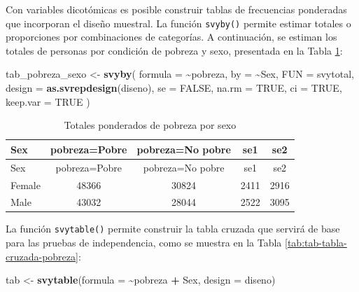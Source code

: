 \documentclass[
  spanish,
  12pt,
]{book}
\newenvironment{Shaded}{\begin{snugshade}}{\end{snugshade}}
\newcommand{\AttributeTok}[1]{\textcolor[rgb]{0.13,0.29,0.53}{#1}}
\newcommand{\ConstantTok}[1]{\textcolor[rgb]{0.56,0.35,0.01}{#1}}
\newcommand{\FunctionTok}[1]{\textcolor[rgb]{0.13,0.29,0.53}{\textbf{#1}}}
\newcommand{\NormalTok}[1]{#1}
\newcommand{\OtherTok}[1]{\textcolor[rgb]{0.56,0.35,0.01}{#1}}
\newcommand{\SpecialCharTok}[1]{\textcolor[rgb]{0.81,0.36,0.00}{\textbf{#1}}}
\begin{document}
Con variables dicotómicas es posible construir tablas de frecuencias ponderadas que incorporan el diseño muestral. La función \texttt{svyby()} permite estimar totales o proporciones por combinaciones de categorías. A continuación, se estiman los totales de personas por condición de pobreza y sexo, presentada en la Tabla \ref{tab:tab-totales-pobreza-sexo}:

\begin{Shaded}
\begin{Highlighting}[]
\NormalTok{tab\_pobreza\_sexo }\OtherTok{\textless{}{-}} \FunctionTok{svyby}\NormalTok{(}
  \AttributeTok{formula =} \SpecialCharTok{\textasciitilde{}}\NormalTok{pobreza,}
  \AttributeTok{by      =} \SpecialCharTok{\textasciitilde{}}\NormalTok{Sex,}
  \AttributeTok{FUN     =}\NormalTok{ svytotal,}
  \AttributeTok{design  =} \FunctionTok{as.svrepdesign}\NormalTok{(diseno),}
  \AttributeTok{se =} \ConstantTok{FALSE}\NormalTok{, }\AttributeTok{na.rm =} \ConstantTok{TRUE}\NormalTok{, }\AttributeTok{ci =} \ConstantTok{TRUE}\NormalTok{, }\AttributeTok{keep.var =} \ConstantTok{TRUE}
\NormalTok{)}
\end{Highlighting}
\end{Shaded}

\begin{longtable}[]{@{}lcccc@{}}
\caption{\label{tab:tab-totales-pobreza-sexo}Totales ponderados de pobreza por sexo}\tabularnewline
\toprule\noalign{}
Sex & pobreza=Pobre & pobreza=No pobre & se1 & se2 \\
\midrule\noalign{}
\endfirsthead
\toprule\noalign{}
Sex & pobreza=Pobre & pobreza=No pobre & se1 & se2 \\
\midrule\noalign{}
\endhead
\bottomrule\noalign{}
\endlastfoot
Female & 48366 & 30824 & 2411 & 2916 \\
Male & 43032 & 28044 & 2522 & 3095 \\
\end{longtable}

La función \texttt{svytable()} permite construir la tabla cruzada que servirá de base para las pruebas de independencia, como se muestra en la Tabla \ref{tab:tab-tabla-cruzada-pobreza}:

\begin{Shaded}
\begin{Highlighting}[]
\NormalTok{tab }\OtherTok{\textless{}{-}} \FunctionTok{svytable}\NormalTok{(}\AttributeTok{formula =} \SpecialCharTok{\textasciitilde{}}\NormalTok{pobreza }\SpecialCharTok{+}\NormalTok{ Sex, }\AttributeTok{design =}\NormalTok{ diseno)}
\end{Highlighting}
\end{Shaded}
\end{document}
